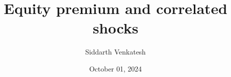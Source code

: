 \documentclass[12pt]{article}
\title{Equity premium and correlated shocks}
\author{Siddarth Venkatesh}
\date{October 01, 2024}
\newcommand{\cd}{Draft 1}
\begin{document}


\onehalfspacing


\end{document}
